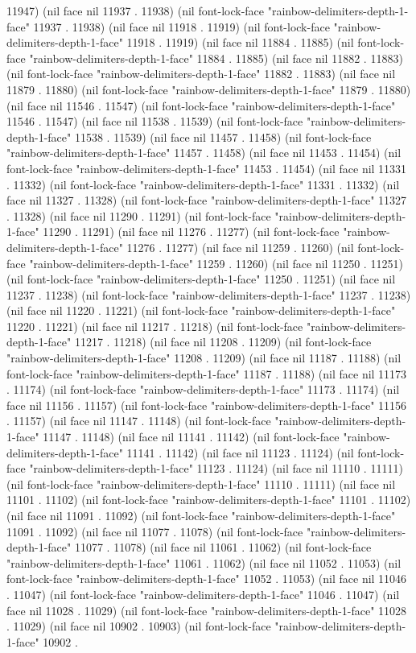 11947) (nil face nil 11937 . 11938) (nil font-lock-face "rainbow-delimiters-depth-1-face" 11937 . 11938) (nil face nil 11918 . 11919) (nil font-lock-face "rainbow-delimiters-depth-1-face" 11918 . 11919) (nil face nil 11884 . 11885) (nil font-lock-face "rainbow-delimiters-depth-1-face" 11884 . 11885) (nil face nil 11882 . 11883) (nil font-lock-face "rainbow-delimiters-depth-1-face" 11882 . 11883) (nil face nil 11879 . 11880) (nil font-lock-face "rainbow-delimiters-depth-1-face" 11879 . 11880) (nil face nil 11546 . 11547) (nil font-lock-face "rainbow-delimiters-depth-1-face" 11546 . 11547) (nil face nil 11538 . 11539) (nil font-lock-face "rainbow-delimiters-depth-1-face" 11538 . 11539) (nil face nil 11457 . 11458) (nil font-lock-face "rainbow-delimiters-depth-1-face" 11457 . 11458) (nil face nil 11453 . 11454) (nil font-lock-face "rainbow-delimiters-depth-1-face" 11453 . 11454) (nil face nil 11331 . 11332) (nil font-lock-face "rainbow-delimiters-depth-1-face" 11331 . 11332) (nil face nil 11327 . 11328) (nil font-lock-face "rainbow-delimiters-depth-1-face" 11327 . 11328) (nil face nil 11290 . 11291) (nil font-lock-face "rainbow-delimiters-depth-1-face" 11290 . 11291) (nil face nil 11276 . 11277) (nil font-lock-face "rainbow-delimiters-depth-1-face" 11276 . 11277) (nil face nil 11259 . 11260) (nil font-lock-face "rainbow-delimiters-depth-1-face" 11259 . 11260) (nil face nil 11250 . 11251) (nil font-lock-face "rainbow-delimiters-depth-1-face" 11250 . 11251) (nil face nil 11237 . 11238) (nil font-lock-face "rainbow-delimiters-depth-1-face" 11237 . 11238) (nil face nil 11220 . 11221) (nil font-lock-face "rainbow-delimiters-depth-1-face" 11220 . 11221) (nil face nil 11217 . 11218) (nil font-lock-face "rainbow-delimiters-depth-1-face" 11217 . 11218) (nil face nil 11208 . 11209) (nil font-lock-face "rainbow-delimiters-depth-1-face" 11208 . 11209) (nil face nil 11187 . 11188) (nil font-lock-face "rainbow-delimiters-depth-1-face" 11187 . 11188) (nil face nil 11173 . 11174) (nil font-lock-face "rainbow-delimiters-depth-1-face" 11173 . 11174) (nil face nil 11156 . 11157) (nil font-lock-face "rainbow-delimiters-depth-1-face" 11156 . 11157) (nil face nil 11147 . 11148) (nil font-lock-face "rainbow-delimiters-depth-1-face" 11147 . 11148) (nil face nil 11141 . 11142) (nil font-lock-face "rainbow-delimiters-depth-1-face" 11141 . 11142) (nil face nil 11123 . 11124) (nil font-lock-face "rainbow-delimiters-depth-1-face" 11123 . 11124) (nil face nil 11110 . 11111) (nil font-lock-face "rainbow-delimiters-depth-1-face" 11110 . 11111) (nil face nil 11101 . 11102) (nil font-lock-face "rainbow-delimiters-depth-1-face" 11101 . 11102) (nil face nil 11091 . 11092) (nil font-lock-face "rainbow-delimiters-depth-1-face" 11091 . 11092) (nil face nil 11077 . 11078) (nil font-lock-face "rainbow-delimiters-depth-1-face" 11077 . 11078) (nil face nil 11061 . 11062) (nil font-lock-face "rainbow-delimiters-depth-1-face" 11061 . 11062) (nil face nil 11052 . 11053) (nil font-lock-face "rainbow-delimiters-depth-1-face" 11052 . 11053) (nil face nil 11046 . 11047) (nil font-lock-face "rainbow-delimiters-depth-1-face" 11046 . 11047) (nil face nil 11028 . 11029) (nil font-lock-face "rainbow-delimiters-depth-1-face" 11028 . 11029) (nil face nil 10902 . 10903) (nil font-lock-face "rainbow-delimiters-depth-1-face" 10902 . 